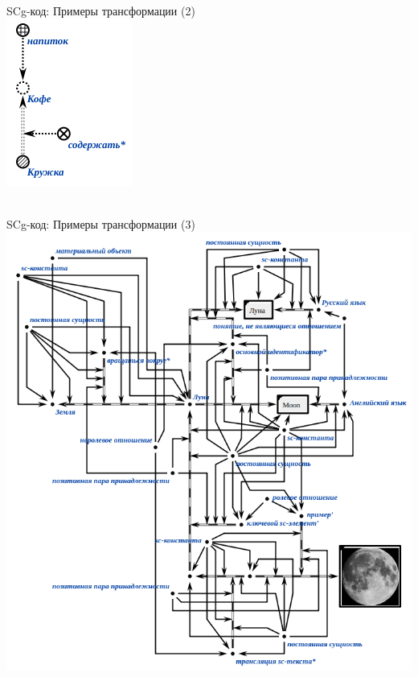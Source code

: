 \begin{frame}{\\SCg-код: Примеры трансформации (2)}
	\topline
	\justifying
	\vspace*{\fill}\\
	\vspace{10mm}
	\centering
	\includegraphics[scale=0.5]{./figures/intro/scg/examples/scg_examples_transf_2_3.png}
\end{frame}

\begin{frame}{\\SCg-код: Примеры трансформации (3)}
	\topline
	\justifying
	\vspace*{\fill}\\
	\vspace{10mm}
	\centering
	\includegraphics[scale=0.4]{./figures/intro/scg/examples/scg_examples_transf_3_1.png}
\end{frame}

